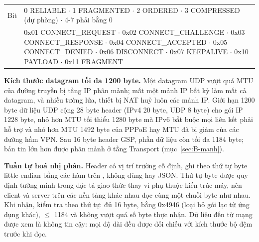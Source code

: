 \begin{center}\small
\begin{tabularx}{\linewidth}{|L{2.6cm}|Y|}
\hline
{} &  \\ \hline
Bit  & 0 RELIABLE $\cdot$ 1 FRAGMENTED $\cdot$ 2 ORDERED $\cdot$ 3 COMPRESSED (dự phòng) $\cdot$ 4-7 phải bằng 0 \\ \hline
{} & 0x01 CONNECT\_REQUEST $\cdot$ 0x02 CONNECT\_CHALLENGE $\cdot$ 0x03 CONNECT\_RESPONSE $\cdot$ 0x04 CONNECT\_ACCEPTED $\cdot$ 0x05 CONNECT\_DENIED $\cdot$ 0x06 DISCONNECT $\cdot$ 0x07 KEEPALIVE $\cdot$ 0x10 PAYLOAD $\cdot$ 0x11 FRAGMENT \\ \hline
\end{tabularx}
\end{center}

\textbf{Kích thước datagram tối đa 1200 byte.} Một datagram UDP vượt quá MTU của đường truyền bị tầng IP phân mảnh;
mất một mảnh IP bất kỳ làm mất cả datagram, và nhiều tường lửa, thiết bị NAT huỷ luôn các mảnh IP. Giới hạn 1200 byte
dữ liệu UDP cộng 28 byte header (IPv4 20 byte, UDP 8 byte) cho gói IP 1228 byte, nhỏ hơn MTU tối thiểu 1280 byte mà
IPv6 bắt buộc mọi liên kết phải hỗ trợ và nhỏ hơn MTU 1492 byte của PPPoE hay MTU đã bị giảm của các đường hầm VPN.
Sau 16 byte header GSP, phần dữ liệu còn tối đa 1184 byte; bản tin lớn hơn được phân mảnh ở tầng Transport (mục~\ref{sec:B-manh}).

\textbf{Tuần tự hoá nhị phân.} Header có vị trí trường cố định, ghi theo thứ tự byte little-endian bằng các hàm
 trên , không dùng  hay JSON. Thứ tự byte được
quy định tường minh trong đặc tả giao thức thay vì phụ thuộc kiến trúc máy, nên client và server trên các nền tảng khác
nhau đọc cùng một chuỗi byte như nhau. Khi nhận,  kiểm tra theo thứ tự: đủ 16 byte, 
bằng 0x4946 (loại bỏ gói lạc từ ứng dụng khác),  $\le$ 1184 và không vượt quá số byte thực nhận.
Dữ liệu đến từ mạng được xem là không tin cậy: mọi độ dài đều được đối chiếu với kích thước bộ đệm trước khi đọc.

